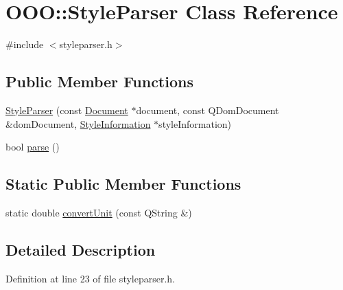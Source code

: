 \hypertarget{classOOO_1_1StyleParser}{\section{O\+O\+O\+:\+:Style\+Parser Class Reference}
\label{classOOO_1_1StyleParser}
}


{\ttfamily \#include $<$styleparser.\+h$>$}

\subsection*{Public Member Functions}
\begin{DoxyCompactItemize}
\item 
\hyperlink{classOOO_1_1StyleParser_ae6b2681706edd74db59a6520021d4e09}{Style\+Parser} (const \hyperlink{classOOO_1_1Document}{Document} $\ast$document, const Q\+Dom\+Document \&dom\+Document, \hyperlink{classOOO_1_1StyleInformation}{Style\+Information} $\ast$style\+Information)
\item 
bool \hyperlink{classOOO_1_1StyleParser_a3844b1c6356dd307e98399b4a0cd048f}{parse} ()
\end{DoxyCompactItemize}
\subsection*{Static Public Member Functions}
\begin{DoxyCompactItemize}
\item 
static double \hyperlink{classOOO_1_1StyleParser_a1dc233046e89e52e037eadad0f64b0d2}{convert\+Unit} (const Q\+String \&)
\end{DoxyCompactItemize}


\subsection{Detailed Description}


Definition at line 23 of file styleparser.\+h.



